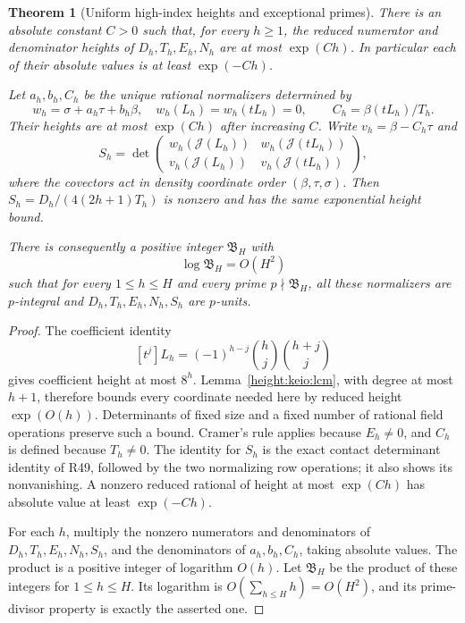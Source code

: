 \documentclass[11pt,a4paper]{article}
\numberwithin{equation}{section}
\newtheorem{theorem}{Theorem}[section]
\theoremstyle{definition}\newtheorem{definition}[theorem]{Definition}
\theoremstyle{remark}\newtheorem{remark}[theorem]{Remark}
\begin{document}
\begin{theorem}[Uniform high-index heights and exceptional primes]
\label{height:keio:badprime}
There is an absolute constant $C>0$ such that, for every $h\ge1$, the
reduced numerator and denominator heights of $D_h,T_h,E_h,N_h$ are at
most $\exp(Ch)$. In particular each of their absolute values is at
least $\exp(-Ch)$.

Let $a_h,b_h,C_h$ be the unique rational normalizers determined by
\[
 w_h=\sigma+a_h\tau+b_h\beta,\quad
 w_h(L_h)=w_h(tL_h)=0,\qquad C_h=\beta(tL_h)/T_h.
\]
Their heights are at most $\exp(Ch)$ after increasing $C$.
Write $v_h=\beta-C_h\tau$ and
\[
 S_h=\det\begin{pmatrix}
 w_h(\mathcal J(L_h))&w_h(\mathcal J(tL_h))\\
 v_h(\mathcal J(L_h))&v_h(\mathcal J(tL_h))
 \end{pmatrix},
\]
where the covectors act in density coordinate order $(\beta,\tau,\sigma)$.
Then $S_h=D_h/(4(2h+1)T_h)$ is nonzero and has the same exponential
height bound.

There is consequently a positive integer $\mathfrak B_H$ with
\[
 \log\mathfrak B_H=O(H^2)
\]
such that for every $1\le h\le H$ and every prime
$p\nmid\mathfrak B_H$, all these normalizers are $p$-integral and
$D_h,T_h,E_h,N_h,S_h$ are $p$-units.
\end{theorem}
\begin{proof}
The coefficient identity
\[
 [t^j]L_h=(-1)^{h-j}\binom hj\binom{h+j}j
\]
gives coefficient height at most $8^h$. Lemma~\ref{height:keio:lcm}, with
degree at most $h+1$, therefore bounds every coordinate needed here
by reduced height $\exp(O(h))$. Determinants of fixed size and a
fixed number of rational field operations preserve such a bound.
Cramer's rule applies because $E_h\ne0$, and $C_h$ is defined because
$T_h\ne0$. The identity for $S_h$ is the exact contact determinant
identity of R49, followed by the two normalizing row operations;
it also shows its nonvanishing. A nonzero reduced rational of height
at most $\exp(Ch)$ has absolute value at least $\exp(-Ch)$.

For each $h$, multiply the nonzero numerators and denominators of
$D_h,T_h,E_h,N_h,S_h$, and the denominators of $a_h,b_h,C_h$, taking
absolute values. The product is a positive integer of logarithm
$O(h)$. Let $\mathfrak B_H$ be the product of these integers for
$1\le h\le H$. Its logarithm is $O(\sum_{h\le H}h)=O(H^2)$,
and its prime-divisor property is exactly the asserted one.
\end{proof}
\end{document}

